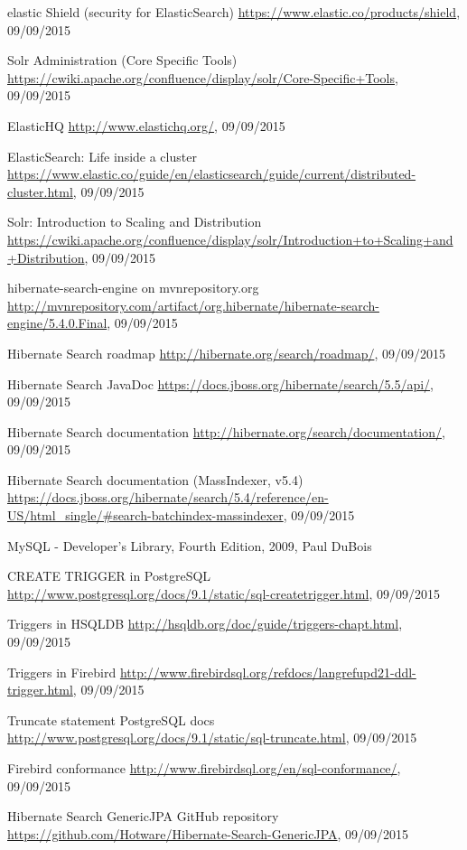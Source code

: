 \begin{thebibliography}{100}
	 elastic Shield (security for ElasticSearch)
	\url{https://www.elastic.co/products/shield}, 09/09/2015
	
	 Solr Administration (Core Specific Tools)
	\url{https://cwiki.apache.org/confluence/display/solr/Core-Specific+Tools}, 09/09/2015
	
	 ElasticHQ
	\url{http://www.elastichq.org/}, 09/09/2015
	
	 ElasticSearch: Life inside a cluster
	\url{https://www.elastic.co/guide/en/elasticsearch/guide/current/distributed-cluster.html}, 09/09/2015
	
	 Solr: Introduction to Scaling and Distribution
	\url{https://cwiki.apache.org/confluence/display/solr/Introduction+to+Scaling+and+Distribution}, 09/09/2015
	
	 hibernate-search-engine on mvnrepository.org
	\url{http://mvnrepository.com/artifact/org.hibernate/hibernate-search-engine/5.4.0.Final}, 09/09/2015
	
	 Hibernate Search roadmap
	\url{http://hibernate.org/search/roadmap/}, 09/09/2015
	
	 Hibernate Search JavaDoc
	\url{https://docs.jboss.org/hibernate/search/5.5/api/}, 09/09/2015
	
	 Hibernate Search documentation
	\url{http://hibernate.org/search/documentation/}, 09/09/2015
	
	 Hibernate Search documentation (MassIndexer, v5.4)
	\url{https://docs.jboss.org/hibernate/search/5.4/reference/en-US/html_single/#search-batchindex-massindexer}, 09/09/2015
	
	 MySQL - Developer's Library, Fourth Edition, 2009, Paul DuBois
	
	 CREATE TRIGGER in PostgreSQL
	\url{http://www.postgresql.org/docs/9.1/static/sql-createtrigger.html}, 09/09/2015
	
	 Triggers in HSQLDB
	\url{http://hsqldb.org/doc/guide/triggers-chapt.html}, 09/09/2015
	
	 Triggers in Firebird
	\url{http://www.firebirdsql.org/refdocs/langrefupd21-ddl-trigger.html}, 09/09/2015
	
	 Truncate statement PostgreSQL docs
	\url{http://www.postgresql.org/docs/9.1/static/sql-truncate.html}, 09/09/2015
	
	 Firebird conformance
	\url{http://www.firebirdsql.org/en/sql-conformance/}, 09/09/2015
	
	 Hibernate Search GenericJPA GitHub repository
	\url{https://github.com/Hotware/Hibernate-Search-GenericJPA}, 09/09/2015
	
	
\end{thebibliography}